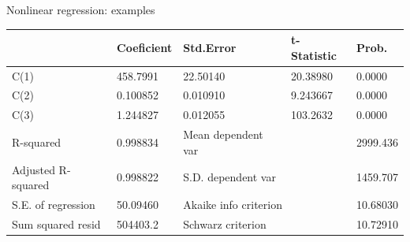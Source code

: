 \documentclass{beamer}
\begin{document}
\begin{frame}{Nonlinear regression: examples}
\begin{table}[]
\begin{tabular}{@{}lllll@{}}
                                                             & Coeficient                                           & Std.Error                                                    & t-Statistic                                           & Prob.                                              \\ \midrule
C(1)                                                         & 458.7991                                             & 22.50140                                                     & 20.38980                                              & 0.0000                                             \\
C(2)                                                         & 0.100852                                             & 0.010910                                                     & 9.243667                                              & 0.0000                                             \\
C(3)                                                         & 1.244827                                             & 0.012055                                                     & 103.2632                                              & 0.0000                                             \\ \midrule
R-squared                                                    & 0.998834                                             & Mean dependent var                                           &                                                       & 2999.436                                           \\
Adjusted R-squared                                           & 0.998822                                             & \multicolumn{2}{l}{S.D. dependent var}                                                                               & 1459.707                                           \\
S.E. of regression                                           & 50.09460                                             & \multicolumn{2}{l}{Akaike info criterion}                                                                            & 10.68030                                           \\
Sum squared resid                                            & 504403.2                                             & \multicolumn{2}{l}{Schwarz criterion}                                                                                & 10.72910                                           \\

\end{tabular}
\end{table}
\end{frame}
\end{document}
